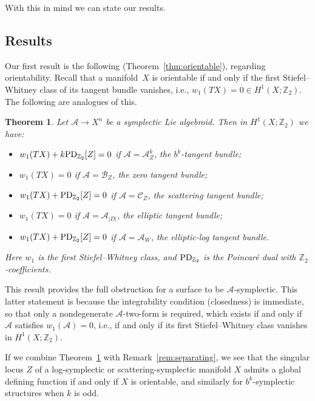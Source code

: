 \documentclass[pdftex]{sigma}
\numberwithin{equation}{section}
\newtheorem{Theorem}{Theorem}[section]
\begin{document}
With this in mind we can state our results.

\subsection{Results}

Our first result is the following (Theorem~\ref{thm:orientable}), regarding orientability. Recall that a mani\-fold~$X$ is orientable if and only if the first Stiefel--Whitney class of its tangent bundle vanishes, i.e., $w_1(TX) = 0 \in H^1(X;\mathbb{Z}_2)$. The following are analogues of this.

\begin{Theorem}\label{thm:introorientable} Let $\mathcal{A} \to X^n$ be a symplectic Lie algebroid. Then in $H^1(X;\mathbb{Z}_2)$ we have:
\begin{itemize}\itemsep=0pt
	\item $w_1(TX) + k {\rm PD}_{\mathbb{Z}_2}[Z] = 0$ if $\mathcal{A} = \mathcal{A}_Z^k$, the $b^k$-tangent bundle;
	\item $w_1(TX) = 0$ if $\mathcal{A} = \mathcal{B}_Z$, the zero tangent bundle;
	\item $w_1(TX) + {\rm PD}_{\mathbb{Z}_2}[Z] = 0$ if $\mathcal{A} = \mathcal{C}_Z$, the scattering tangent bundle;
	\item $w_1(TX) = 0$ if $\mathcal{A} = \mathcal{A}_{|D|}$, the elliptic tangent bundle;
	\item $w_1(TX) + {\rm PD}_{\mathbb{Z}_2}[Z] = 0$ if $\mathcal{A} = \mathcal{A}_W$, the elliptic-log tangent bundle.
	\end{itemize}
Here $w_1$ is the first Stiefel--Whitney class, and ${\rm PD}_{\mathbb{Z}_2}$ is the Poincar\'e dual with $\mathbb{Z}_2$-coefficients.
\end{Theorem}

This result provides the full obstruction for a surface to be $\mathcal{A}$-symplectic. This latter statement is because the integrability condition (closedness) is immediate, so that only a nondegenerate $\mathcal{A}$-two-form is required, which exists if and only if $\mathcal{A}$ satisfies $w_1(\mathcal{A}) = 0$, i.e., if and only if its first Stiefel--Whitney class vanishes in $H^1(X;\mathbb{Z}_2)$.

\begin{Remark} If we combine Theorem~\ref{thm:introorientable} with Remark~\ref{rem:separating}, we see that the singular locus $Z$ of a log-symplectic or scattering-symplectic manifold $X$ admits a global defining function if and only if $X$ is orientable, and similarly for $b^k$-symplectic structures when $k$ is odd.
\end{Remark}
\end{document}
